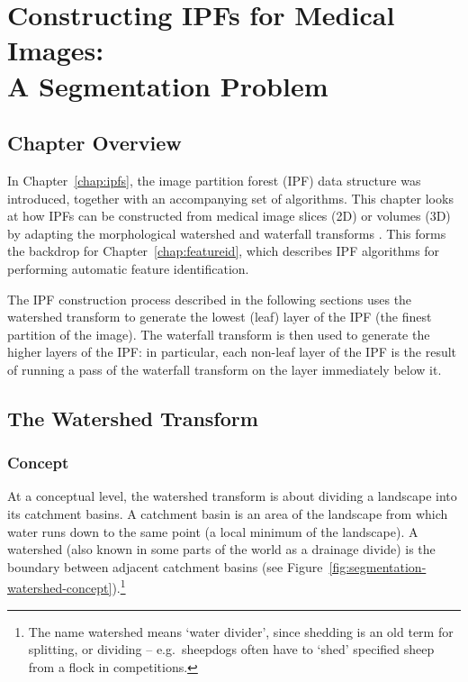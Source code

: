 \chapter[Constructing IPFs for Medical Images: A Segmentation Problem]{Constructing IPFs for Medical Images:\\A Segmentation Problem}
\label{chap:segmentation}

\section{Chapter Overview}

In Chapter~\ref{chap:ipfs}, the image partition forest (IPF) data structure was introduced, together with an accompanying set of algorithms. This chapter looks at how IPFs can be constructed from medical image slices (2D) or volumes (3D) by adapting the morphological watershed and waterfall transforms \cite{beucher94,marcotegui05}. This forms the backdrop for Chapter~\ref{chap:featureid}, which describes IPF algorithms for performing automatic feature identification.

The IPF construction process described in the following sections uses the watershed transform to generate the lowest (leaf) layer of the IPF (the finest partition of the image). The waterfall transform is then used to generate the higher layers of the IPF: in particular, each non-leaf layer of the IPF is the result of running a pass of the waterfall transform on the layer immediately below it.

\section{The Watershed Transform}

\subsection{Concept}

At a conceptual level, the watershed transform is about dividing a landscape into its catchment basins. A catchment basin is an area of the landscape from which water runs down to the same point (a local minimum of the landscape). A watershed (also known in some parts of the world as a drainage divide) is the boundary between adjacent catchment basins (see Figure~\ref{fig:segmentation-watershed-concept}).\footnote{The name watershed means `water divider', since shedding is an old term for splitting, or dividing -- e.g.~sheepdogs often have to `shed' specified sheep from a flock in competitions.}

